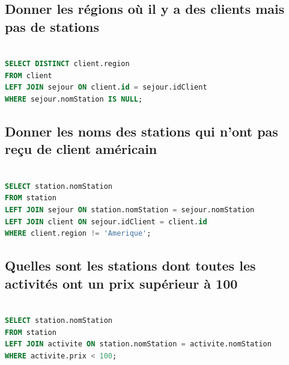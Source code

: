 \documentclass{article}
\begin{document}
\subsection{Donner les régions où il y a des clients mais pas de stations}

\begin{lstlisting}[language=SQL]

SELECT DISTINCT client.region
FROM client
LEFT JOIN sejour ON client.id = sejour.idClient
WHERE sejour.nomStation IS NULL;

\end{lstlisting}

\subsection{Donner les noms des stations qui n’ont pas reçu de client américain}

\begin{lstlisting}[language=SQL]

SELECT station.nomStation
FROM station
LEFT JOIN sejour ON station.nomStation = sejour.nomStation
LEFT JOIN client ON sejour.idClient = client.id
WHERE client.region != 'Amerique';

\end{lstlisting}

\subsection{Quelles sont les stations dont toutes les activités ont un prix supérieur à 100}

\begin{lstlisting}[language=SQL]

SELECT station.nomStation
FROM station
LEFT JOIN activite ON station.nomStation = activite.nomStation
WHERE activite.prix < 100;

\end{lstlisting}
\end{document}
